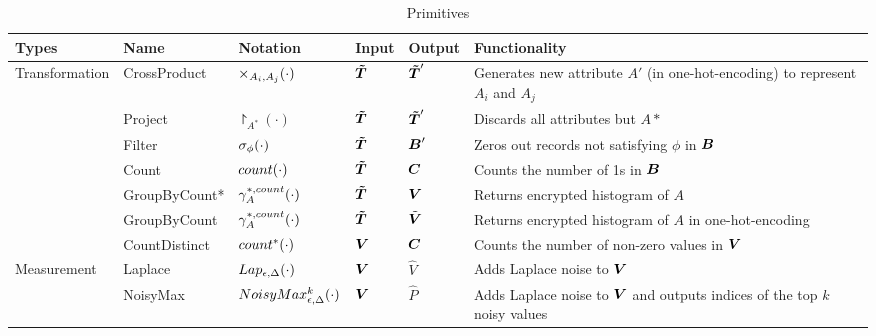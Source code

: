 

\begin{table*}[]
\small{
\caption {\system Primitives}\label{tab:primitives}
\begin{tabular}{|l|l|l|l|l|l|}
\hline
\bf{Types}                           & \bf{Name}         & \bf{Notation} & \bf{Input} & \bf{Output} & \bf{Functionality} \\ \hline \hline
\multirow{7}{*}{Transformation} & \textsf{CrossProduct} &  $\times_{A_i,A_j}(\cdot)$ &  $\boldsymbol{\tilde{T}}$   &  $\boldsymbol{\tilde{T}}'$   & Generates new attribute $A'$ (in one-hot-encoding) to represent $A_i$ and $A_j$  \\ \cline{2-6}
                                & \textsf{Project}     & $\project_{A^*}(\cdot)$  &  $\boldsymbol{\tilde{T}}$       &  $\boldsymbol{\tilde{T}}'$       &  Discards all attributes but $A*$ \\ \cline{2-6}
                                & \textsf{Filter}       & $\sigma_{\phi}(\cdot)$   &  $\boldsymbol{\tilde{T}}$      &   $\boldsymbol{B}'$     &  Zeros out records not satisfying $\phi$    in $\boldsymbol{B}$          \\ \cline{2-6}
                                & \textsf{Count}             & $count(\cdot)$         & $\boldsymbol{\tilde{T}}$  &  $\boldsymbol{C}$    &  Counts the number of 1s in $\boldsymbol{B}$               \\ \cline{2-6}
                                & \textsf{GroupByCount*}             & $\gamma^{*,count}_{A}(\cdot)$ &  $\boldsymbol{\tilde{T}}$  & $\boldsymbol{V}$    & Returns encrypted histogram of $A$                \\ \cline{2-6}
                                & \textsf{GroupByCount}              & $\gamma^{*,count}_{A}(\cdot)$    &$\boldsymbol{\tilde{T}}$       & $\tilde{\boldsymbol{V}}$        &  Returns encrypted histogram of $A$ in one-hot-encoding    \\ \cline{2-6}
                                & \textsf{CountDistinct}             & $count^*(\cdot)$     &    $\boldsymbol{V}$   & $\boldsymbol{C}$   &  Counts the number of non-zero values in $\boldsymbol{V}$       \\ \hline
\multirow{2}{*}{Measurement}    & \textsf{Laplace}     & $Lap_{\epsilon,\Delta}(\cdot)$    &  $\boldsymbol{V}$      &   $\hat{V}$    &  Adds Laplace noise to $\boldsymbol{V}$    \\ \cline{2-6}
                                & \textsf{NoisyMax}     & $NoisyMax_{\epsilon,\Delta}^k(\cdot)$         & $\boldsymbol{V}$       &  $\hat{P}$      &  Adds Laplace noise to $\boldsymbol{V}$ and outputs indices of the top $k$ noisy values              \\ \hline
\end{tabular}
}
\end{table*}


